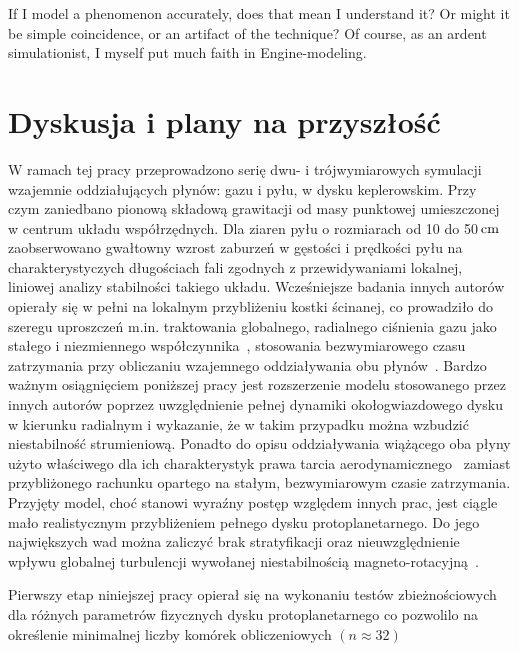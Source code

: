 \begin{savequote}[75mm]
   If I model a phenomenon accurately, does that mean I understand it? Or might
   it be simple coincidence, or an artifact of the technique? Of course, as an
   ardent simulationist, I myself put much faith in Engine-modeling.
\end{savequote}

\chapter{Dyskusja i plany na przyszłość}
W ramach tej pracy przeprowadzono serię dwu- i trójwymiarowych symulacji
wzajemnie oddziałujących płynów: gazu i pyłu, w dysku keplerowskim. Przy czym
zaniedbano pionową składową grawitacji od masy punktowej umieszczonej w centrum
układu współrzędnych. Dla ziaren pyłu o rozmiarach od 10 do 50$\hbox{$\thinspace\textrm{cm}$}$
zaobserwowano gwałtowny wzrost zaburzeń w gęstości i prędkości pyłu na
charakterystyczych długościach fali zgodnych z przewidywaniami lokalnej,
liniowej analizy stabilności takiego układu. Wcześniejsze badania innych
autorów~\cite{YG05, JY07, TB09, BS10a, BS10b} opierały się w pełni na lokalnym
przybliżeniu kostki ścinanej, co prowadziło do szeregu uproszczeń m.in.
traktowania globalnego, radialnego ciśnienia gazu jako stałego i niezmiennego
współczynnika~\cite{N86}, stosowania bezwymiarowego czasu zatrzymania przy
obliczaniu wzajemnego oddziaływania obu płynów~\cite{YG05}. Bardzo ważnym
osiągnięciem poniższej pracy jest rozszerzenie modelu stosowanego przez innych
autorów poprzez uwzględnienie pełnej dynamiki okołogwiazdowego dysku w kierunku
radialnym i wykazanie, że w takim przypadku można wzbudzić niestabilność
strumieniową. Ponadto do opisu oddziaływania wiążącego oba płyny użyto
właściwego dla ich charakterystyk prawa tarcia aerodynamicznego~
zamiast przybliżonego rachunku opartego na stałym, bezwymiarowym czasie
zatrzymania. Przyjęty model, choć stanowi wyraźny postęp względem innych prac, jest
ciągle mało realistycznym przybliżeniem pełnego dysku protoplanetarnego. Do jego
największych wad można zaliczyć brak stratyfikacji oraz nieuwzględnienie wpływu
globalnej turbulencji wywołanej niestabilnością magneto-rotacyjną~\cite{DKJ14}. 
%
\par Pierwszy etap niniejszej pracy opierał się na wykonaniu testów
zbieżnościowych dla różnych parametrów fizycznych dysku protoplanetarnego co
pozwolilo na określenie minimalnej liczby komórek obliczeniowych $(n\approx32)$

